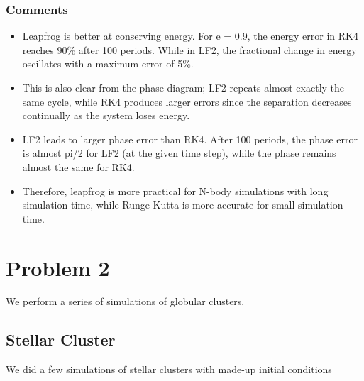 \subsubsection*{Comments}
\begin{itemize}
	\item  Leapfrog is better at conserving energy. For e = 0.9, the energy error in RK4 reaches 90\% after 100 periods. While in LF2, the fractional change in energy oscillates with a maximum error of 5\%.
	
	\item This is also clear from the phase diagram; LF2 repeats almost exactly the same cycle, while RK4 produces larger errors since the separation decreases continually as the system loses energy.
	
	\item LF2 leads to larger phase error than RK4. After 100 periods, the phase error is almost pi/2 for LF2 (at the given time step), while the phase remains almost the same for RK4.
	
	\item Therefore, leapfrog is more practical for N-body simulations with long simulation time, while Runge-Kutta is more accurate for small simulation time. 
	
\end{itemize}

\section*{Problem 2}
We perform a series of simulations of globular clusters.

\subsection*{Stellar Cluster}
We did a few simulations of stellar clusters with made-up initial conditions 

